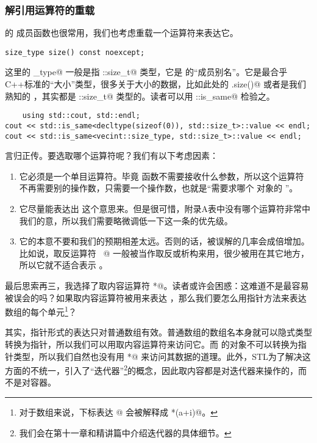 \subsubsection*{解引用运算符的重载}
\lstinline@vecint@ 的 \lstinline@size@ 成员函数也很常用，我们也考虑重载一个运算符来表达它。
\begin{lstlisting}
size_type size() const noexcept;
\end{lstlisting}
这里的 \lstinline@size_type@ 一般是指 \lstinline@std::size_t@ 类型，它是 \lstinline@vecint@ 的``成员别名''。它是最合乎C++标准的``大小''类型，很多关于大小的数据，比如此处的 \lstinline@vec.size()@ 或者是我们熟知的 \lstinline@sizeof@，其实都是 \lstinline@std::size_t@ 类型的。读者可以用 \lstinline@std::is_same@ 检验之。
\begin{lstlisting}
    using std::cout, std::endl;
cout << std::is_same<decltype(sizeof(0)), std::size_t>::value << endl;
cout << std::is_same<vecint::size_type, std::size_t>::value << endl;
\end{lstlisting}\par
言归正传。要选取哪个运算符呢？我们有以下考虑因素：
\begin{enumerate}
    \item 它必须是一个单目运算符。毕竟 \lstinline@size@ 函数不需要接收什么参数，所以这个运算符不再需要别的操作数，只需要一个操作数，也就是``需要求哪个 \lstinline@vecint@ 对象的 \lstinline@size@''。
    \item 它尽量能表达出 \lstinline@size@ 这个意思来。但是很可惜，附录A表中没有哪个运算符非常中我们的意，所以我们需要略微调低一下这一条的优先级。
    \item 它的本意不要和我们的预期相差太远。否则的话，被误解的几率会成倍增加。比如说，取反运算符 \lstinline@~@ 一般被当作取反或析构来用，很少被用在其它地方，所以它就不适合表示 \lstinline@size@。
\end{enumerate}
最后思索再三，我选择了取内容运算符 \lstinline@*@。读者或许会困惑：这难道不是最容易被误会的吗？如果取内容运算符被用来表达 \lstinline@size@，那么我们要怎么用指针方法来表达数组的每个单元\footnote{对于数组来说，下标表达 \lstinline@a[i]@ 会被解释成 \lstinline@*(a+i)@。}？\par
其实，指针形式的表达只对普通数组有效。普通数组的数组名本身就可以隐式类型转换为指针，所以我们可以用取内容运算符来访问它。而 \lstinline@vecint@ 的对象不可以转换为指针类型，所以我们自然也没有用 \lstinline@*@ 来访问其数据的道理。此外，STL为了解决这方面的不统一，引入了``迭代器''\footnote{我们会在第十一章和精讲篇中介绍迭代器的具体细节。}的概念，因此取内容都是对迭代器来操作的，而不是对容器。\par
